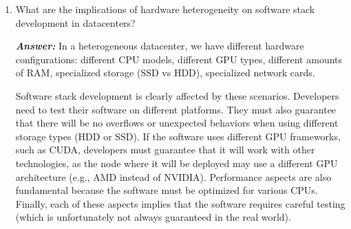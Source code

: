 \begin{enumerate}
    \item What are the implications of hardware heterogeneity on software stack development in datacenters?
    
    \textcolor{Green3}{\textbf{\emph{Answer:}}} In a heterogeneous datacenter, we have different hardware configurations: different CPU models, different GPU types, different amounts of RAM, specialized storage (SSD vs HDD), specialized network cards.

    Software stack development is clearly affected by these scenarios. Developers need to test their software on different platforms. They must also guarantee that there will be no overflows or unexpected behaviors when using different storage types (HDD or SSD). If the software uses different GPU frameworks, such as CUDA, developers must guarantee that it will work with other technologies, as the node where it will be deployed may use a different GPU architecture (e.g., AMD instead of NVIDIA). Performance aspects are also fundamental because the software must be optimized for various CPUs. Finally, each of these aspects implies that the software requires careful testing (which is unfortunately not always guaranteed in the real world).
\end{enumerate}